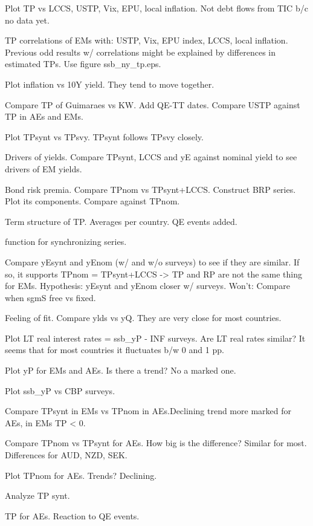 \documentclass[12pt]{article}
\newcommand{\cmark}{\ding{51}}
\newcommand{\done}{\rlap{$\square$}{\raisebox{2pt}{\large\hspace{1pt}\cmark}}%
	\hspace{-2.5pt}}
\begin{document}
\begin{todolist}
	\item[\done] Plot TP vs LCCS, USTP, Vix, EPU, local inflation. Not debt flows from TIC b/c no data yet.
	\item[\done] TP correlations of EMs with: USTP, Vix, EPU index, LCCS, local inflation. Previous odd results w/ correlations might be explained by differences in estimated TPs. Use figure ssb_ny_tp.eps.
	\item[\done] Plot inflation vs 10Y yield. They tend to move together.
	\item[\done] Compare TP of Guimaraes vs KW. Add QE-TT dates. Compare USTP against TP in AEs and EMs.
	\item[\done] Plot TPsynt vs TPsvy. TPsynt follows TPsvy closely.
	\item[\done] Drivers of yields. Compare TPsynt, LCCS and yE against nominal yield to see drivers of EM yields.
	\item[\done] Bond risk premia. Compare TPnom vs TPsynt+LCCS. Construct BRP series. Plot its components. Compare against TPnom.
	\item[\done] Term structure of TP. Averages per country. QE events added.
	\item[\done] function for synchronizing series.
	\item[\done] Compare yEsynt and yEnom (w/ and w/o surveys) to see if they are similar. If so, it supports TPnom = TPsynt+LCCS -> TP and RP are not the same thing for EMs. Hypothesis: yEsynt and yEnom  closer w/ surveys. Won't: Compare when sgmS free vs fixed.
	\item[\done] Feeling of fit. Compare ylds vs yQ. They are very close for most countries.
	\item[\done] Plot LT real interest rates = ssb_yP - INF surveys. Are LT real rates similar? It seems that for most countries it fluctuates b/w 0 and 1 pp.
	\item[\done] Plot yP for EMs and AEs. Is there a trend? No a marked one.
	\item[\done] Plot ssb_yP vs CBP surveys. 
	\item[\done] Compare TPsynt in EMs vs TPnom in AEs.Declining trend more marked for AEs, in EMs TP < 0.
	\item[\done] Compare TPnom vs TPsynt for AEs. How big is the difference? Similar for most. Differences for AUD, NZD, SEK.
	\item[\done] Plot TPnom for AEs. Trends? Declining.
	\item[\done] Analyze TP synt.
	\item[\done] TP for AEs. Reaction to QE events.

\end{todolist}
\end{document}
